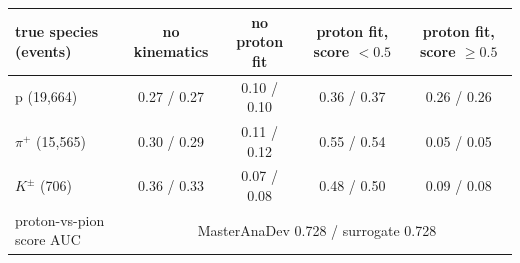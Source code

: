 \begin{tabular}{lcccc}
\toprule
true species (events) & no kinematics & no proton fit & proton fit, score $<0.5$ & proton fit, score $\geq 0.5$ \\
\midrule
p (19,664) & 0.27 / 0.27 & 0.10 / 0.10 & 0.36 / 0.37 & 0.26 / 0.26 \\
$\pi^+$ (15,565) & 0.30 / 0.29 & 0.11 / 0.12 & 0.55 / 0.54 & 0.05 / 0.05 \\
$K^\pm$ (706) & 0.36 / 0.33 & 0.07 / 0.08 & 0.48 / 0.50 & 0.09 / 0.08 \\
\midrule
proton-vs-pion score AUC & \multicolumn{4}{c}{MasterAnaDev 0.728 / surrogate 0.728} \\
\bottomrule
\end{tabular}
